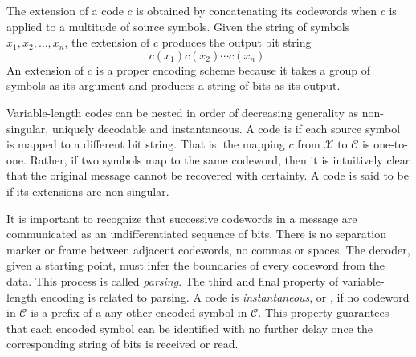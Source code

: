 The extension of a code $c$ is obtained by concatenating its codewords when $c$ is applied to a multitude of source symbols.
Given the string of symbols $x_1, x_2, \ldots, x_n$, the extension of $c$ produces the output bit string
\begin{equation*}
c(x_1) c(x_2) \cdots c(x_n) .
\end{equation*}
An extension of $c$ is a proper encoding scheme because it takes a group of symbols as its argument and produces a string of bits as its output.

Variable-length codes can be nested in order of decreasing generality as non-singular, uniquely decodable and instantaneous.
A code is  if each source symbol is mapped to a different bit string.
That is, the mapping $c$ from $\mathcal{X}$ to $\mathcal{C}$ is one-to-one.
Rather, if two symbols map to the same codeword, then it is intuitively clear that the original message cannot be recovered with certainty.
A code is said to be  if its extensions are non-singular.

It is important to recognize that successive codewords in a message are communicated as an undifferentiated sequence of bits.
There is no separation marker or frame between adjacent codewords, no commas or spaces.
The decoder, given a starting point, must infer the boundaries of every codeword from the data.
This process is called \emph{parsing}.
The third and final property of variable-length encoding is related to parsing.
A code is \emph{instantaneous}, or , if no codeword in $\mathcal{C}$ is a prefix of a any other encoded symbol in $\mathcal{C}$.
This property guarantees that each encoded symbol can be identified with no further delay once the corresponding string of bits is received or read.

